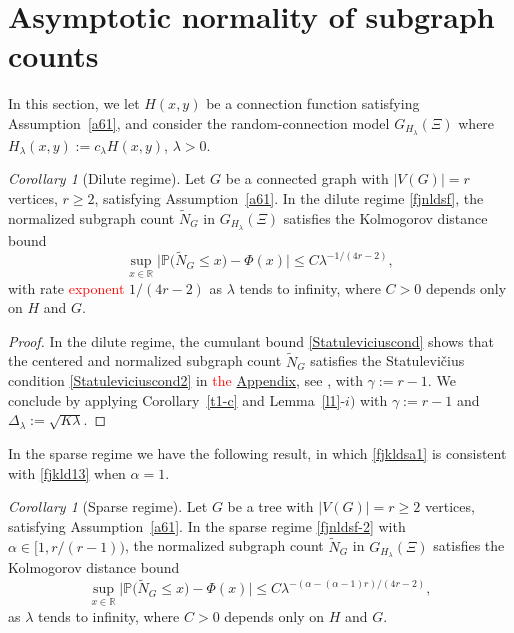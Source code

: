 \documentclass[bj,authoryear,noshowframe]{imsart}
\theoremstyle{plain}
\theoremstyle{remark}
\def\P{\mathbb{P}}
\def\real{{\mathord{\mathbb R}}}
\newtheorem{corollary}[prop]{Corollary}
\begin{document}
\section{Asymptotic normality of subgraph counts}
\label{s6-1}
\noindent
 In this section, we let $H(x,y)$ be a connection function  
  satisfying Assumption~\ref{a61},
  and consider the
  random-connection model $G_{H_\lambda} (\Xi)$
  where $H_\lambda(x,y):= c_\lambda H(x,y)$,
  $\lambda >0$.
\begin{corollary}[Dilute regime]
  \label{c01}
  Let $G$ be a connected graph with $|V(G)|=r$ vertices, $r\geq 2$,
  satisfying Assumption~\ref{a61}. 
  In the dilute regime \eqref{fjnldsf},
  the normalized subgraph count $\widetilde{N}_G$ in 
  $G_{H_\lambda} (\Xi)$ satisfies
  the Kolmogorov distance bound %
\begin{equation}
  \label{fjkld13}
  \sup_{x\in \real}
\big| \P \big( \widetilde{N}_G \leq x \big) - \Phi(x) \big| \leq
C \lambda^{ - 1/(4r - 2)},
\end{equation}
 with rate \textcolor{red}{exponent} $1/(4r -2)$ as $\lambda$ tends to infinity, where $C>0$ depends only on $H$ and $G$.
\end{corollary}
\begin{proof}
   In the dilute regime, the cumulant bound 
 \eqref{Statuleviciuscond} 
 shows that
 the centered and normalized subgraph count
 $\widetilde{N}_G$ 
 satisfies the {Statulevi\v{c}ius condition}
 \eqref{Statuleviciuscond2} in \textcolor{red}{the} \hyperref[appn]{Appendix}, see \cite{rudzkis,doering},
 with $\gamma := r-1$. 
 We conclude by applying Corollary~\ref{t1-c}
 and Lemma~\ref{l1}-$i)$ with $\gamma :=r-1$
 and $\Delta_\lambda:=\sqrt{K \lambda}$. 
\end{proof}
In the sparse regime we have the following result, 
 in which \eqref{fjkldsa1} is consistent with
 \eqref{fjkld13} when $\alpha = 1$.
\begin{corollary}[Sparse regime]
  \label{c01-2}
  Let $G$ be a tree with $|V(G)| = r \geq 2$ vertices,
  satisfying Assumption~\ref{a61}. 
  In the sparse regime \eqref{fjnldsf-2}
  with $\alpha \in [1, r/(r-1) )$,
  the normalized subgraph count $\widetilde{N}_G$ in 
  $G_{H_\lambda} (\Xi)$ satisfies
  the Kolmogorov distance bound %
\begin{equation}
\label{fjkldsa1} 
\sup_{x\in \real}
\big| \P \big( \widetilde{N}_G \leq x \big) - \Phi(x) \big| \leq
C \lambda^{ - (
 \alpha   -(\alpha - 1)r 
    ) / ( 4r - 2) }, 
\end{equation} 
 as $\lambda$ tends to infinity, where $C>0$ depends only on $H$ and $G$.
\end{corollary}
\end{document}
